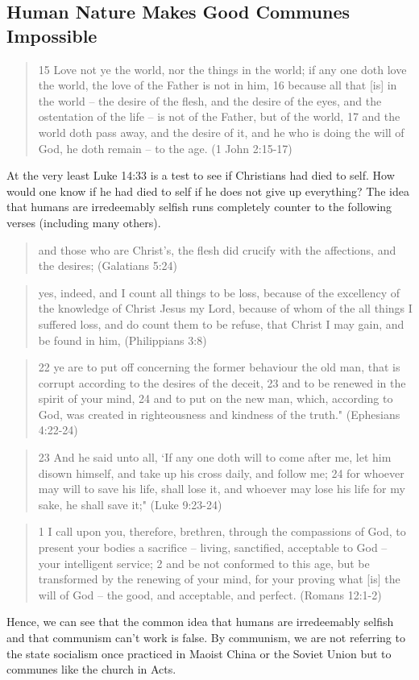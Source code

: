 \documentclass[11pt]{article}
\begin{document}
\subsection{Human Nature Makes Good Communes Impossible}
\begin{quote}
15 Love not ye the world, nor the things in the world; if any one doth love the world, the love of the Father is not in him,
16 because all that [is] in the world -- the desire of the flesh, and the desire of the eyes, and the ostentation of the life -- is not of the Father, but of the world, 17 and the world doth pass away, and the desire of it, and he who is doing the will of God, he doth remain -- to the age. (1 John 2:15-17)
\end{quote}
 At the very least Luke 14:33 is a test to see if Christians had died to self. How would one know if he had died to self if he does not give up everything? The idea that humans are irredeemably selfish runs completely counter to the following verses (including many others).\cite{death to self verses}
\begin{quote}
and those who are Christ's, the flesh did crucify with the affections, and the desires; (Galatians 5:24)
\end{quote}
\begin{quote}
yes, indeed, and I count all things to be loss, because of the excellency of the knowledge of Christ Jesus my Lord, because of whom of the all things I suffered loss, and do count them to be refuse, that Christ I may gain, and be found in him, (Philippians 3:8)
\end{quote}
\begin{quote}
22 ye are to put off concerning the former behaviour the old man, that is corrupt according to the desires of the deceit, 23 and to be renewed in the spirit of your mind, 24 and to put on the new man, which, according to God, was created in righteousness and kindness of the truth." (Ephesians 4:22-24)  
\end{quote}
\begin{quote}
23 And he said unto all, `If any one doth will to come after me, let him disown himself, and take up his cross daily, and follow me; 24 for whoever may will to save his life, shall lose it, and whoever may lose his life for my sake, he shall save it;" (Luke 9:23-24)
\end{quote}
\begin{quote}
1 I call upon you, therefore, brethren, through the compassions of God, to present your bodies a sacrifice -- living, sanctified, acceptable to God -- your intelligent service; 2 and be not conformed to this age, but be transformed by the renewing of your mind, for your proving what [is] the will of God -- the good, and acceptable, and perfect. (Romans 12:1-2)
 \end{quote} 
Hence, we can see that the common idea that humans are irredeemably selfish and that communism can't work is false. By communism, we are not referring to the state socialism once practiced in Maoist China or the Soviet Union but to communes like the church in Acts.
\end{document}

